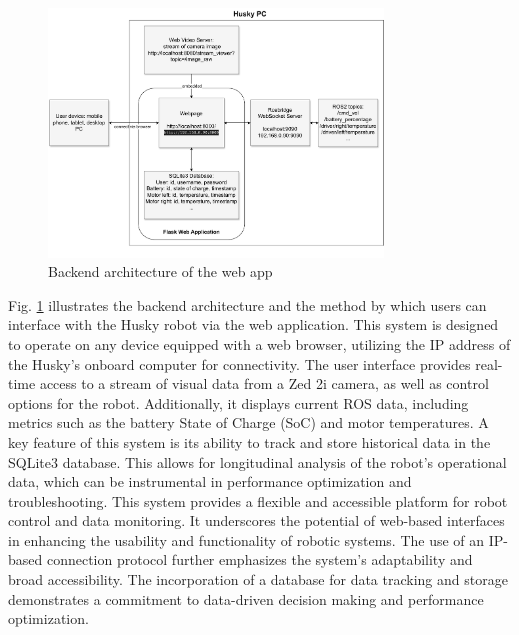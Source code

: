 \documentclass[conference]{IEEEtran}
\begin{document}
\begin{figure}[htbp]
    \centerline{\includegraphics[width=8.9cm]{Pictures/userapp.pdf}}
    \caption{Backend architecture of the web app}
    \label{fig:userapp}
\end{figure}
Fig. \ref{fig:userapp} illustrates the backend architecture and the method by which users can interface with the Husky robot via the web application. This system is designed to operate on any device equipped with a web browser, utilizing the IP address of the Husky's onboard computer for connectivity.
The user interface provides real-time access to a stream of visual data from a Zed 2i camera, as well as control options for the robot. Additionally, it displays current ROS data, including metrics such as the battery State of Charge (SoC) and motor temperatures.
A key feature of this system is its ability to track and store historical data in the SQLite3 database. This allows for longitudinal analysis of the robot's operational data, which can be instrumental in performance optimization and troubleshooting.
This system provides a flexible and accessible platform for robot control and data monitoring. It underscores the potential of web-based interfaces in enhancing the usability and functionality of robotic systems. 
The use of an IP-based connection protocol further emphasizes the system's adaptability and broad accessibility. The incorporation of a database for data tracking and storage demonstrates a commitment to data-driven decision making and performance optimization. 
\end{document}
